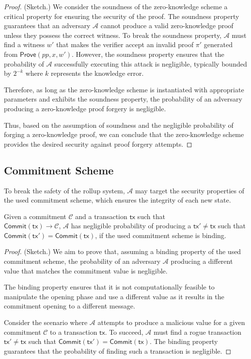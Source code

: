\begin{proof}(Sketch.)
We consider the soundness of the zero-knowledge scheme a critical property for ensuring the security of the proof. The soundness property guarantees that an adversary $\mathcal{A}$ cannot produce a valid zero-knowledge proof unless they possess the correct witness.
To break the soundness property, $\mathcal{A}$ must find a witness $w'$ that makes the verifier accept an invalid proof $\pi'$ generated from $\mathsf{Prove}(pp, x, w')$. However, the soundness property ensures that the probability of $\mathcal{A}$ successfully executing this attack is negligible, typically bounded by $2^{-k}$ where $k$ represents the knowledge error.

Therefore, as long as the zero-knowledge scheme is instantiated with appropriate parameters and exhibits the soundness property, the probability of an adversary producing a zero-knowledge proof forgery is negligible.

Thus, based on the assumption of soundness and the negligible probability of forging a zero-knowledge proof, we can conclude that the zero-knowledge scheme provides the desired security against proof forgery attempts.
\end{proof}


\subsection*{Commitment Scheme}

To break the safety of the rollup system, $\mathcal{A}$ may target the security properties of the used commitment scheme, which ensures the integrity of each new state. 

\begin{theorem}
    Given a commitment $\mathcal{C}$ and a transaction $\mathsf{tx}$ such that \\$\mathsf{Commit(tx)} \rightarrow \mathcal{C}$, $\mathcal{A}$ has negligible probability of producing a $\mathsf{tx'} \neq \mathsf{tx}$ such that $\mathsf{Commit(tx')} = \mathsf{Commit(tx)}$, if the used commitment scheme is binding. 
\end{theorem}

\begin{proof}(Sketch.)
We aim to prove that, assuming a binding property of the used commitment scheme, the probability of an adversary $\mathcal{A}$ producing a different value that matches the commitment value is negligible.

The binding property ensures that it is not computationally feasible to manipulate the opening phase and use a different value as it results in the commitment opening to a different message. 

Consider the scenario where $\mathcal{A}$ attempts to produce a malicious value for a given commitment $\mathcal{C}$ to a transaction $\mathsf{tx}$. To succeed, $\mathcal{A}$ must find a rogue transaction $\mathsf{tx'} \neq \mathsf{tx}$ such that $\mathsf{Commit(tx')} = \mathsf{Commit(tx)}$. The binding property guarantees that the probability of finding such a transaction is negligible. 
\end{proof}

